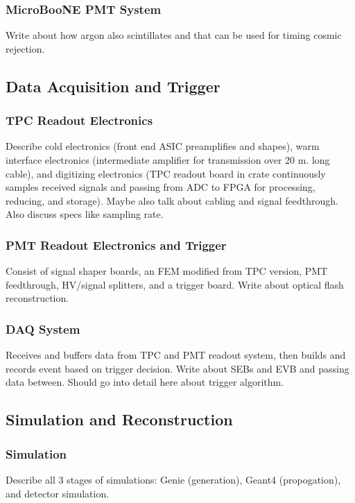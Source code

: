   \subsubsection{MicroBooNE PMT System}
    Write about how argon also scintillates and that can be used for timing
    cosmic rejection.

\subsection{Data Acquisition and Trigger}\label{daq}
  \subsubsection{TPC Readout Electronics}
    Describe cold electronics (front end ASIC preamplifies and shapes), warm
    interface electronics (intermediate amplifier for transmission over 20 m.
        long cable), and digitizing electronics (TPC readout board in crate
          continuously samples received signals and passing from ADC to FPGA
          for processing, reducing, and storage). Maybe also talk about cabling
        and signal feedthrough. Also discuss specs like sampling rate.
  \subsubsection{PMT Readout Electronics and Trigger}
    Consist of signal shaper boards, an FEM modified from TPC version, PMT
    feedthrough, HV/signal splitters, and a trigger board. Write about optical
    flash reconstruction.
  \subsubsection{DAQ System}
    Receives and buffers data from TPC and PMT readout system, then builds and
    records event based on trigger decision. Write about SEBs and EVB and
    passing data between. Should go into detail here about trigger algorithm.

\subsection{Simulation and Reconstruction}\label{reco}
  \subsubsection{Simulation}
    Describe all 3 stages of simulations: Genie (generation), Geant4
    (propogation), and detector simulation.
